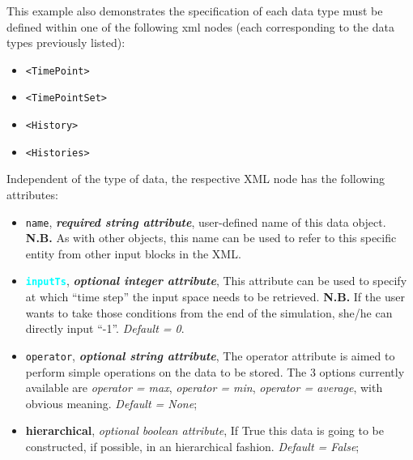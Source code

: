 This example also demonstrates the specification of each data type must be
defined within one of the following xml nodes (each corresponding to the data
types previously listed):
\begin{itemize}
   \item \texttt{<TimePoint>}
   \item \texttt{<TimePointSet>}
   \item \texttt{<History>}
   \item \texttt{<Histories>}
\end{itemize}
Independent of the type of data, the respective XML node has the following
attributes:
\vspace{-5mm}
\begin{itemize}
\itemsep0em
\item \texttt{name}, \textit{\textbf{required string attribute}}, user-defined 
name of this data object.
%
\textbf{N.B.} As with other objects, this name can be used to refer to this
specific entity from other input blocks in the XML.
\item \textcolor{cyan}{\textbf{\texttt{inputTs}}}, \textit{\textbf{optional integer attribute}}, This 
attribute can be used to specify at which ``time step'' the input space needs to
be retrieved. 
%
\textbf{N.B.} If the user wants to take those conditions from the end of the
simulation, she/he can directly input ``-1''.
%
\textit{Default = 0}.
\item \texttt{operator}, \textit{\textbf{optional string attribute}}, The operator attribute is aimed to perform simple operations on the data to be stored. The 3 options currently available are \textit{operator = max}, \textit{operator = min}, \textit{operator = average}, with obvious meaning. \textit{Default = None};
\item \textbf{hierarchical}, \textit{optional boolean attribute}, If True this data is going to be constructed, if possible, in an hierarchical fashion. \textit{Default = False};
\end{itemize}
